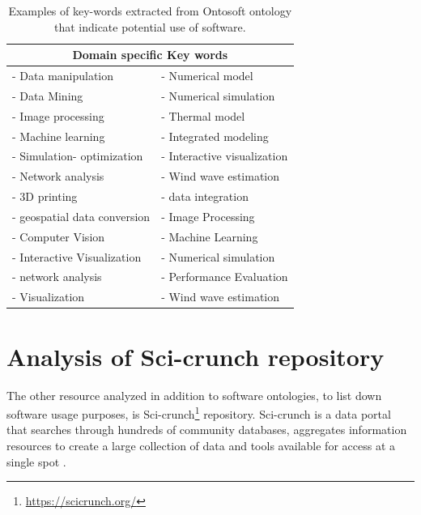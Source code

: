 \begin{table}[h!]
	\begin{center}
		\caption{Examples of key-words extracted from Ontosoft ontology that indicate potential use of software.}
		\label{tab:table1}
		\begin{tabular}{|l|l|} %
			
			\hline
			\multicolumn{2}{|c|}{Domain specific Key words }\\
			\hline
			-	Data manipulation & -	Numerical model \\
			-	Data Mining       & -	Numerical simulation \\
			-	Image processing  & -   Thermal model \\
			-	Machine learning  & -   Integrated modeling \\
			-	Simulation- optimization & - Interactive visualization \\
			-	Network analysis & - Wind wave estimation \\
			- 3D printing         & - data integration \\
			- geospatial data conversion & - Image Processing \\
			- Computer Vision & - Machine Learning \\
			- Interactive Visualization & - Numerical simulation \\
			- network analysis & - Performance Evaluation \\
			- Visualization & -  Wind wave estimation \\
			\hline
		\end{tabular}
	\end{center}
\end{table}
\section{Analysis of Sci-crunch repository }
\label{sec:purpose:Sci}
The other resource analyzed in addition to software ontologies, to list down software usage purposes, is Sci-crunch\footnote{\url{https://scicrunch.org/}} repository. Sci-crunch is a data portal that searches through hundreds of community databases, aggregates information resources to create a large collection of data and tools available for access at a single spot \citep{grethe2016scicrunch}. \\

